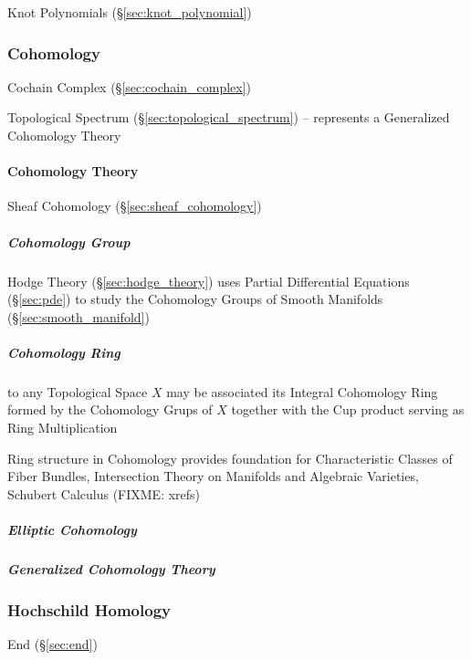 \fist Knot Polynomials (\S\ref{sec:knot_polynomial})



\subsubsection{Cohomology}\label{sec:cohomology}

Cochain Complex (\S\ref{sec:cochain_complex})

Topological Spectrum (\S\ref{sec:topological_spectrum}) --
represents a Generalized Cohomology Theory



\paragraph{Cohomology Theory}\label{sec:cohomology_theory}\hfill

Sheaf Cohomology (\S\ref{sec:sheaf_cohomology})



\subparagraph{Cohomology Group}\label{sec:cohomology_group}\hfill

\fist Hodge Theory (\S\ref{sec:hodge_theory}) uses Partial Differential
Equations (\S\ref{sec:pde}) to study the Cohomology Groups of Smooth Manifolds
(\S\ref{sec:smooth_manifold})



\subparagraph{Cohomology Ring}\label{sec:cohomology_ring}\hfill

to any Topological Space $X$ may be associated its Integral Cohomology Ring
formed by the Cohomology Grups of $X$ together with the Cup product serving as
Ring Multiplication

Ring structure in Cohomology provides foundation for Characteristic Classes of
Fiber Bundles, Intersection Theory on Manifolds and Algebraic Varieties,
Schubert Calculus (FIXME: xrefs)



\subparagraph{Elliptic Cohomology}\label{sec:elliptic_cohomology}\hfill

\subparagraph{Generalized Cohomology Theory}
\label{sec:generalized_cohomology_theory}\hfill



\subsubsection{Hochschild Homology}\label{sec:hochschild_homology}

End (\S\ref{sec:end})



